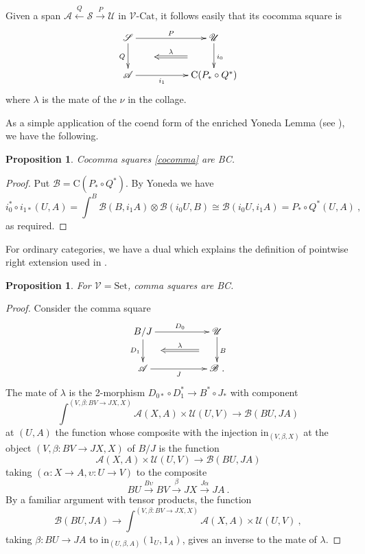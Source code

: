 \documentclass[a4paper,12pt]{article}
\newtheorem{proposition}[theorem]{Proposition}
\theoremstyle{definition}
\theoremstyle{fact}
\theoremstyle{genquest}
\theoremstyle{step}
\newcommand{\ra}{\rightarrow}
\newcommand{\lra}{\longrightarrow}
\newcommand{\lla}{\longleftarrow}
\def\CA{{\mathscr A}}
\def\CB{{\mathscr B}}
\def\CS{{\mathscr S}}
\def\CU{{\mathscr U}}
\def\CV{{\mathscr V}}
\begin{document}
{Given a span $\CA \stackrel{Q}\lla \CS \stackrel{P}\lra \CU$ in
$\CV\text{-}\mathrm{Cat}$, it follows easily that its cocomma square is
 \begin{equation}\label{cocomma}
\begin{aligned}
\xymatrix{
\CS \ar[d]_{Q}^(0.5){\phantom{aaaaa}}="1" \ar[rr]^{P}  && \CU \ar[d]^{i_0}_(0.5){\phantom{aaaaa}}="2" \ar@{<=}"1";"2"^-{\lambda}
\\
\CA \ar[rr]_-{i_1} && \mathrm{C}(P_*\circ Q^*) 
}
\end{aligned}
\end{equation}
where $\lambda$ is the mate of the $\nu$ in the collage.

As a simple application of the coend form of the enriched Yoneda Lemma (see \cite{KellyBook}), we have the following.

\begin{proposition}
Cocomma squares \eqref{cocomma} are BC.
\end{proposition}
\begin{proof}
Put $\CB = \mathrm{C}(P_*\circ Q^*)$.
By Yoneda we have $$i_0^*\circ i_{1*}(U,A)= \int^{B}{\CB(B,i_1A)\otimes \CB(i_0U,B)} \cong \CB(i_0U,i_1A)=P_*\circ Q^*(U,A) \ ,$$
as required.
\end{proof}

For ordinary categories, we have a dual which explains the definition of pointwise right extension used in \cite{FYL}. 

\begin{proposition}
For $\CV = \mathrm{Set}$, comma squares are BC.
\end{proposition}
\begin{proof}
Consider the comma square
\begin{equation}\label{comma}
\begin{aligned}
\xymatrix{
B/J \ar[d]_{D_1}^(0.5){\phantom{aaa}}="1" \ar[rr]^{D_0}  && \CU \ar[d]^{B}_(0.5){\phantom{aaa}}="2" \ar@{<=}"1";"2"^-{\lambda}
\\
\CA \ar[rr]_-{J} && \CB \ . 
}
\end{aligned}
\end{equation}
The mate of $\lambda$ is the 2-morphism $D_{0 *}\circ D_1^* \lra B^*\circ J_*$
with component 
$$\int^{(V,\beta : BV \ra JX,X)}{\CA(X,A)\times \CU(U,V)} \lra \CB(BU,JA)$$
at $(U,A)$ the function whose composite with the injection $\mathrm{in}_{(V,\beta ,X)}$ at the object 
$(V,\beta : BV \ra JX,X)$ of $B/J$ is the function
$$\CA(X,A)\times \CU(U,V) \lra \CB(BU,JA)$$
taking $(\alpha : X\ra A, \upsilon : U\ra V)$ to the composite
$$BU\stackrel{B\upsilon}\lra BV \stackrel{\beta}\lra JX \stackrel{J\alpha}\lra JA \ .$$ 
By a familiar argument with tensor products, the function
$$\CB(BU,JA) \lra \int^{(V,\beta : BV \ra JX,X)}{\CA(X,A)\times \CU(U,V) \ ,}$$
taking $\beta : BU \ra JA$ to $\mathrm{in}_{(U,\beta ,A)}(1_U,1_A)$,
gives an inverse to the mate of $\lambda$.  
\end{proof}

}
\end{document}
